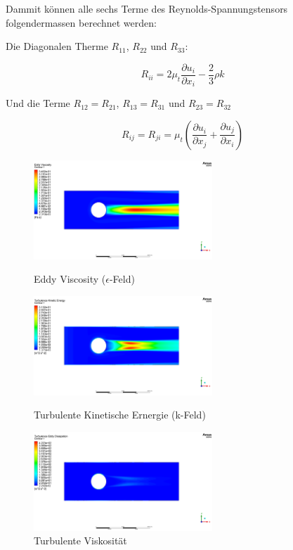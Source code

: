 Dammit können alle sechs Terme des Reynolds-Spannungstensors folgendermassen berechnet werden:

Die Diagonalen Therme $R_{11}$, $R_{22}$ und $R_{33}$:

\begin{equation}
    R_{ii} = 2 \mu_t \frac{\partial u_i}{\partial x_i} - \frac{2}{3}\rho k
\end{equation}

Und die Terme $R_{12} = R_{21}$, $R_{13} = R_{31}$ und $R_{23} = R_{32}$

\begin{equation}
    R_{ij} = R_{ji} = \mu_t \left(\frac{\partial u_i}{\partial x_j} + \frac{\partial u_j}{\partial x_i}\right)
\end{equation}

\begin{figure}
  \centering
  \includegraphics[width=0.6\textwidth]{papers/reynolds/images/eddy-viscosity.png}
  \caption{Eddy Viscosity ($\epsilon$-Feld)}
  \label{fig:e}
  \centering
  \includegraphics[width=0.6\textwidth]{papers/reynolds/images/turbulence-kinetic-energy.png}
  \caption{Turbulente Kinetische Ernergie (k-Feld)}
  \label{fig:k}
  \centering
  \includegraphics[width=0.6\textwidth]{papers/reynolds/images/turbulent-viscosity.png}
  \caption{Turbulente Viskosität}
  \label{fig:mu-t}
\end{figure}
